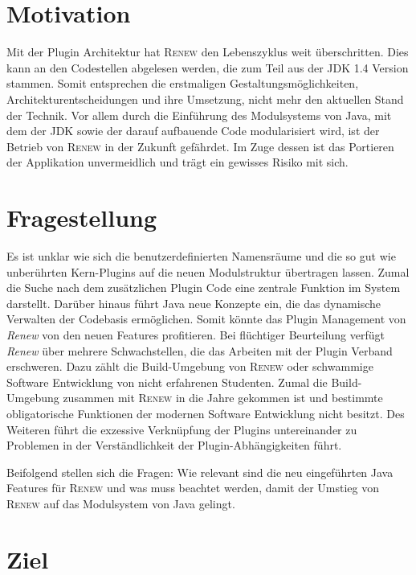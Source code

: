 \section{Motivation} \label{sec:motivation}
	Mit der Plugin Architektur hat \textsc{Renew} den Lebenszyklus weit überschritten. Dies kann an den Codestellen abgelesen werden, die zum Teil aus der JDK 1.4 Version stammen. Somit entsprechen die erstmaligen Gestaltungsmöglichkeiten, Architekturentscheidungen und ihre Umsetzung, nicht mehr den aktuellen Stand der Technik. Vor allem durch die Einführung des Modulsystems von Java, mit dem der JDK sowie der darauf aufbauende Code modularisiert wird, ist der Betrieb von \textsc{Renew} in der Zukunft gefährdet. Im Zuge dessen ist das Portieren der Applikation unvermeidlich und trägt ein gewisses Risiko mit sich.

\section{Fragestellung} \label{sec:KdS}
	Es ist unklar wie sich die benutzerdefinierten Namensräume und die so gut wie unberührten Kern-Plugins auf die neuen Modulstruktur übertragen lassen. Zumal die Suche nach dem zusätzlichen Plugin Code eine zentrale Funktion im System darstellt.\newline
	Darüber hinaus führt Java neue Konzepte ein, die das dynamische Verwalten der Codebasis ermöglichen. Somit könnte das Plugin Management von \textit{Renew} von den neuen Features profitieren. \bigbreak
	Bei flüchtiger Beurteilung verfügt \textit{Renew} über mehrere Schwachstellen, die das Arbeiten mit der Plugin Verband erschweren. Dazu zählt die Build-Umgebung von \textsc{Renew} oder schwammige Software Entwicklung von nicht erfahrenen Studenten. Zumal die Build-Umgebung zusammen mit \textsc{Renew} in die Jahre gekommen ist und bestimmte obligatorische Funktionen der modernen Software Entwicklung nicht besitzt. Des Weiteren führt die exzessive Verknüpfung der Plugins untereinander zu Problemen in der Verständlichkeit der Plugin-Abhängigkeiten führt.\bigbreak

	Beifolgend stellen sich die Fragen: Wie relevant sind die neu eingeführten Java Features für \textsc{Renew} und was muss beachtet werden, damit der Umstieg von \textsc{Renew} auf das Modulsystem von Java gelingt.

\section{Ziel} \label{sec:Z}

